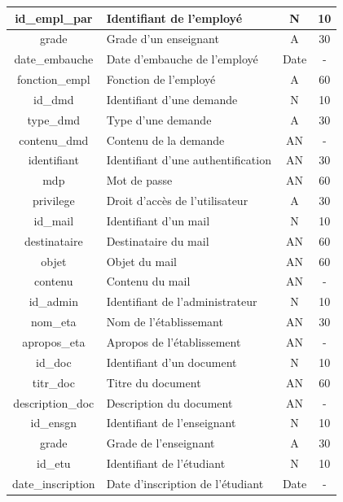 \begin{center}
{\begin{longtable}{|c|>{\centering}m{7cm}|c|c|}
				\hline id\_empl\_par & Identifiant de l'employé & N & 10 \\
				\hline grade & Grade d'un enseignant & A & 30 \\ 
				\hline date\_embauche & Date d'embauche de l'employé & Date & - \\
				\hline fonction\_empl & Fonction de l'employé & A & 60 \\
				
				\hline id\_dmd & Identifiant d'une demande & N & 10 \\
				\hline type\_dmd & Type d'une demande & A & 30 \\
				\hline contenu\_dmd & Contenu de la demande & AN & - \\
				
				\hline identifiant & Identifiant d'une authentification & AN & 30 \\
				\hline mdp & Mot de passe & AN & 60 \\
				\hline privilege & Droit d'accès de l'utilisateur & A & 30 \\
				
				\hline id\_mail & Identifiant d'un mail & N & 10 \\
				\hline destinataire & Destinataire du mail & AN & 60 \\
				\hline objet & Objet du mail & AN & 60 \\
				\hline contenu & Contenu du mail & AN & - \\
				
				\hline id\_admin & Identifiant de l'administrateur & N & 10 \\
				
				\hline nom\_eta & Nom de l'établissemant & AN & 30 \\
				\hline apropos\_eta & Apropos de l'établissement & AN & - \\
				
				\hline id\_doc & Identifiant d'un document & N & 10 \\
				\hline titr\_doc & Titre du document & AN & 60 \\
				\hline description\_doc & Description du document & AN & - \\
				             
				\hline id\_ensgn & Identifiant de l'enseignant & N & 10 \\
				\hline grade & Grade de l'enseignant & A & 30 \\
				
				\hline id\_etu & Identifiant de l'étudiant & N & 10 \\
				\hline date\_inscription & Date d'inscription de l'étudiant & Date & - \\
				

\end{longtable}}
\end{center}
